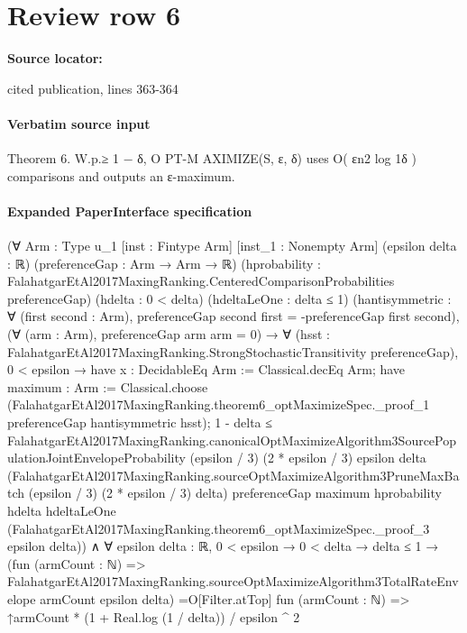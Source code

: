 \documentclass[10pt]{article}
\begin{document}
\section*{Review row 6}
\textbf{Source locator:} {\footnotesize\raggedright cited publication, lines 363-\allowbreak{}364\par}
\paragraph{Verbatim source input}
\begin{ReviewVerbatim}
Theorem 6. W.p.≥ 1 − δ, O PT-M AXIMIZE(S, ε, δ) uses O( εn2 log 1δ ) comparisons and outputs an
ε-maximum.
\end{ReviewVerbatim}



\paragraph{Expanded PaperInterface specification}
\begin{ReviewVerbatim}
(∀ {Arm : Type u_1} [inst : Fintype Arm] [inst_1 : Nonempty Arm] (epsilon delta : ℝ) (preferenceGap : Arm → Arm → ℝ)
    (hprobability : FalahatgarEtAl2017MaxingRanking.CenteredComparisonProbabilities preferenceGap) (hdelta : 0 < delta)
    (hdeltaLeOne : delta ≤ 1)
    (hantisymmetric : ∀ (first second : Arm), preferenceGap second first = -preferenceGap first second),
    (∀ (arm : Arm), preferenceGap arm arm = 0) →
      ∀ (hsst : FalahatgarEtAl2017MaxingRanking.StrongStochasticTransitivity preferenceGap),
        0 < epsilon →
          have x : DecidableEq Arm := Classical.decEq Arm;
          have maximum : Arm :=
            Classical.choose
              (FalahatgarEtAl2017MaxingRanking.theorem6_optMaximizeSpec._proof_1 preferenceGap hantisymmetric hsst);
          1 - delta ≤
            FalahatgarEtAl2017MaxingRanking.canonicalOptMaximizeAlgorithm3SourcePopulationJointEnvelopeProbability
              (epsilon / 3) (2 * epsilon / 3) epsilon delta
              (FalahatgarEtAl2017MaxingRanking.sourceOptMaximizeAlgorithm3PruneMaxBatch (epsilon / 3) (2 * epsilon / 3)
                delta)
              preferenceGap maximum hprobability hdelta hdeltaLeOne
              (FalahatgarEtAl2017MaxingRanking.theorem6_optMaximizeSpec._proof_3 epsilon delta)) ∧
  ∀ {epsilon delta : ℝ},
    0 < epsilon →
      0 < delta →
        delta ≤ 1 →
          (fun (armCount : ℕ) =>
              FalahatgarEtAl2017MaxingRanking.sourceOptMaximizeAlgorithm3TotalRateEnvelope armCount epsilon
                delta) =O[Filter.atTop]
            fun (armCount : ℕ) => ↑armCount * (1 + Real.log (1 / delta)) / epsilon ^ 2
\end{ReviewVerbatim}
\end{document}

